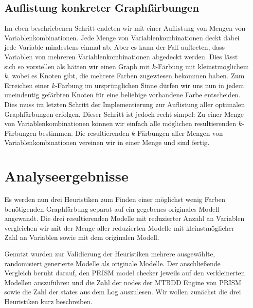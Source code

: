 \documentclass[a4paper]{article}
\theoremstyle{nonumberplain}
\begin{document}
\subsection{Auflistung konkreter Graphfärbungen}

Im eben beschriebenen Schritt endeten wir mit einer Auflistung von Mengen von Variablenkombinationen. Jede Menge von Variablenkombinationen deckt dabei jede Variable mindestens einmal ab. Aber es kann der Fall auftreten, dass Variablen von mehreren Variablenkombinationen abgedeckt werden. Dies lässt sich so vorstellen als hätten wir einen Graph mit $k$-Färbung mit kleinstmöglichem $k$, wobei es Knoten gibt, die mehrere Farben zugewiesen bekommen haben. Zum Erreichen einer $k$-Färbung im ursprünglichen Sinne dürfen wir uns nun in jedem uneindeutig gefärbten Knoten für eine beliebige vorhandene Farbe entscheiden. Dies muss im letzten Schritt der Implementierung zur Auflistung aller optimalen Graphfärbungen erfolgen. Dieser Schritt ist jedoch recht simpel:
Zu einer Menge von Variablenkombinationen können wir einfach alle möglichen resultierenden $k$-Färbungen bestimmen. Die resultierenden $k$-Färbungen aller Mengen von Variablenkombinationen vereinen wir in einer Menge und sind fertig.


\section{Analyseergebnisse}

\newcommand{\mmfh}{MaxMer}
\newcommand{\wph}{WelPow}
\newcommand{\rnh}{RemNod}

Es werden nun drei Heuristiken zum Finden einer möglichst wenig Farben benötigenden Graphfärbung separat auf ein gegebenes originales Modell angewandt.
Die drei resultierenden Modelle mit reduzierter Anzahl an Variablen vergleichen wir mit der Menge aller reduzierten Modelle mit kleinstmöglicher Zahl an Variablen sowie mit dem originalen Modell.

Genutzt wurden zur Validierung der Heuristiken mehrere ausgewählte, randomisiert generierte Modelle als originale Modelle. Der anschließende Vergleich beruht darauf, den PRISM model checker jeweils auf den verkleinerten Modellen auszuführen und die Zahl der nodes der MTBDD Engine von PRISM sowie die Zahl der states aus dem Log auszulesen.
Wir wollen zunächst die drei Heuristiken kurz beschreiben.
\end{document}
